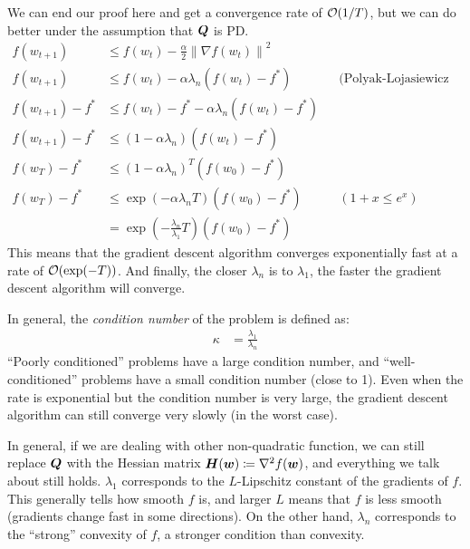 \documentclass{article}
\theoremstyle{plain}
\theoremstyle{definition}
\theoremstyle{remark}
\newcommand{\norm}[1]{\left\lVert#1\right\rVert}
\begin{document}
We can end our proof here and get a convergence rate of ${\mathcal{O}}(1 / T)$, but we can do better under the assumption that ${\bm{Q}}$ is PD.
\begin{align}
    f(w_{t+1})       & \le f(w_t) - \frac{\alpha}{2} \norm{\nabla f(w_t)}^2                                                                   \\
    f(w_{t+1})       & \le f(w_t) - \alpha \lambda_n \left(f(w_t) - f^*\right)                     &  & \text{(Polyak-Lojasiewicz condition)} \\
    f(w_{t+1}) - f^* & \le f(w_t) - f^* - \alpha \lambda_n \left(f(w_t) - f^*\right)                                                          \\
    f(w_{t+1}) - f^* & \le (1 - \alpha \lambda_n) \left(f(w_t) - f^*\right)                                                                   \\
    f(w_T) - f^*     & \le (1 - \alpha \lambda_n)^T \left(f(w_0) - f^*\right)                                                                 \\
    f(w_T) - f^*     & \le \exp\left(-\alpha \lambda_n T\right) \left(f(w_0) - f^*\right)          &  & (1 + x \le e^x)                       \\
                     & = \exp\left(-\frac{\lambda_n}{\lambda_1} T\right) \left(f(w_0) - f^*\right)
\end{align}
This means that the gradient descent algorithm converges exponentially fast at a rate of ${\mathcal{O}}(\exp(-T))$.
%
And finally, the closer $\lambda_n$ is to $\lambda_1$, the faster the gradient descent algorithm will converge.

In general, the \emph{condition number} of the problem is defined as:
\begin{align}
    \kappa & = \frac{\lambda_1}{\lambda_n}
\end{align}
``Poorly conditioned'' problems have a large condition number, and ``well-conditioned'' problems have a small condition number (close to 1).
%
Even when the rate is exponential but the condition number is very large, the gradient descent algorithm can still converge very slowly (in the worst case).

In general, if we are dealing with other non-quadratic function, we can still replace ${\bm{Q}}$ with the Hessian matrix ${\bm{H}}({\bm{w}}) \coloneqq \nabla^2 f({\bm{w}})$, and everything we talk about still holds.
%
$\lambda_1$ corresponds to the $L$-Lipschitz constant of the gradients of $f$.
%
This generally tells how smooth $f$ is, and larger $L$ means that $f$ is less smooth (gradients change fast in some directions).
%
On the other hand, $\lambda_n$ corresponds to the ``strong'' convexity of $f$, a stronger condition than convexity.
\end{document}
